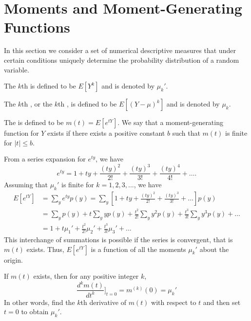 \documentclass[12pt, a4paper, twoside, openright, titlepage]{book}
\begin{document}
\section{\textsection Moments and Moment-Generating Functions}

In this section we consider a set of numerical descriptive measures that under certain conditions uniquely determine the probability distribution of a random variable.

\begin{defn}{}{}
    The $k$th  is defined to be $E[Y^k]$ and is denoted by $\mu_k'$.
\end{defn}


\begin{defn}{}{}
    The $k$th , or the $k$th , is defined to be $E[(Y-\mu)^k]$ and is denoted by $\mu_k$.
\end{defn}

\begin{defn}{}{}
    The  is defined to be $m(t) = E[e^{tY}]$. We say that a moment-generating function for $Y$ exists if there exists a positive constant $b$ such that $m(t)$ is finite for $|t| \leq b$.
\end{defn}

From a series expansion for $e^{ty}$, we have \begin{equation*}
    e^{ty} = 1 + ty + \frac{(ty)^2}{2!} + \frac{(ty)^3}{3!} + \frac{(ty)^4}{4!} + \hdots.
\end{equation*}
Assuming that $\mu_k'$ is finite for $k = 1,2,3,...$, we have \begin{align*}
    E[e^{tY}] &= \sum\limits_ye^{ty}p(y) = \sum\limits_y\left[ 1 + ty + \frac{(ty)^2}{2!} + \frac{(ty)^3}{3!} + \hdots\right]p(y) \\
    &= \sum\limits_yp(y) + t\sum\limits_yyp(y) + \frac{t^2}{2!}\sum\limits_yy^2p(y) + \frac{t^3}{3!}\sum\limits_yy^3p(y) + \hdots \\
    &= 1 + t\mu_1' + \frac{t^2}{2!}\mu_2' + \frac{t^3}{3!}\mu_3' + \hdots 
\end{align*}
This interchange of summations is possible if the series is convergent, that is $m(t)$ exists. Thus, $E[e^{tY}]$ is a function of all the moments $\mu_k'$ about the origin. 


\begin{thm}{}{}
    If $m(t)$ exists, then for any positive integer $k$, \begin{equation*}
        \frac{d^km(t)}{dt^k}\Bigg]_{t=0} = m^{(k)}(0) = \mu_k'
    \end{equation*}
    In other words, find the $k$th derivative of $m(t)$ with respect to $t$ and then set $t = 0$ to obtain $\mu_k'$.
\end{thm}
\end{document}
